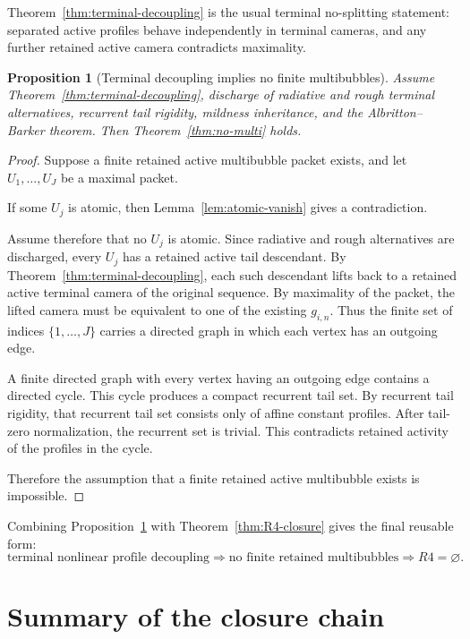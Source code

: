 \documentclass[11pt]{article}
\numberwithin{equation}{section}
\newtheorem{proposition}[theorem]{Proposition}
\begin{document}
Theorem~\ref{thm:terminal-decoupling} is the usual terminal no-splitting
statement: separated active profiles behave independently in terminal cameras,
and any further retained active camera contradicts maximality.

\begin{proposition}[Terminal decoupling implies no finite multibubbles]
\label{prop:decoupling-to-no-multi}
Assume Theorem~\ref{thm:terminal-decoupling}, discharge of radiative and rough
terminal alternatives, recurrent tail rigidity, mildness inheritance, and the
Albritton--Barker theorem.  Then Theorem~\ref{thm:no-multi} holds.
\end{proposition}

\begin{proof}
Suppose a finite retained active multibubble packet exists, and let
\(U_1,\ldots,U_J\) be a maximal packet.

If some \(U_j\) is atomic, then Lemma~\ref{lem:atomic-vanish} gives a
contradiction.

Assume therefore that no \(U_j\) is atomic.  Since radiative and rough
alternatives are discharged, every \(U_j\) has a retained active tail
descendant.  By Theorem~\ref{thm:terminal-decoupling}, each such descendant
lifts back to a retained active terminal camera of the original sequence.  By
maximality of the packet, the lifted camera must be equivalent to one of the
existing \(g_{i,n}\).  Thus the finite set of indices
\(\{1,\ldots,J\}\) carries a directed graph in which each vertex has an
outgoing edge.

A finite directed graph with every vertex having an outgoing edge contains a
directed cycle.  This cycle produces a compact recurrent tail set.  By
recurrent tail rigidity, that recurrent tail set consists only of affine
constant profiles.  After tail-zero normalization, the recurrent set is
trivial.  This contradicts retained activity of the profiles in the cycle.

Therefore the assumption that a finite retained active multibubble exists is
impossible.
\end{proof}

Combining Proposition~\ref{prop:decoupling-to-no-multi} with
Theorem~\ref{thm:R4-closure} gives the final reusable form:
\[
  \boxed{
  \text{terminal nonlinear profile decoupling}
  \Longrightarrow
  \text{no finite retained multibubbles}
  \Longrightarrow
  R4=\varnothing.
  }
\]

\section{Summary of the closure chain}
\end{document}
